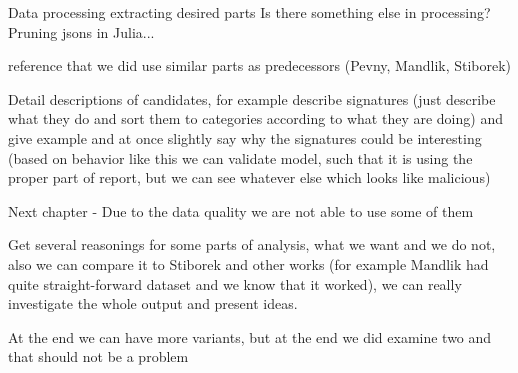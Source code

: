 Data processing
extracting desired parts
Is there something else in processing?
Pruning jsons in Julia...

reference that we did use similar parts as predecessors (Pevny, Mandlik, Stiborek)

Detail descriptions of candidates, for example describe signatures (just describe what they do and sort them to categories according to what they are doing) and give example and at once slightly say why the signatures could be interesting (based on behavior like this we can validate model, such that it is using the proper part of report, but we can see whatever else which looks like malicious)


Next chapter - Due to the data quality we are not able to use some of them

Get several reasonings for some parts of analysis, what we want and we do not, also we can compare it to Stiborek and other works (for example Mandlik had quite straight-forward dataset and we know that it worked), we can really investigate the whole output and present ideas. 


At the end we can have more variants, but at the end we did examine two and that should not be a problem
